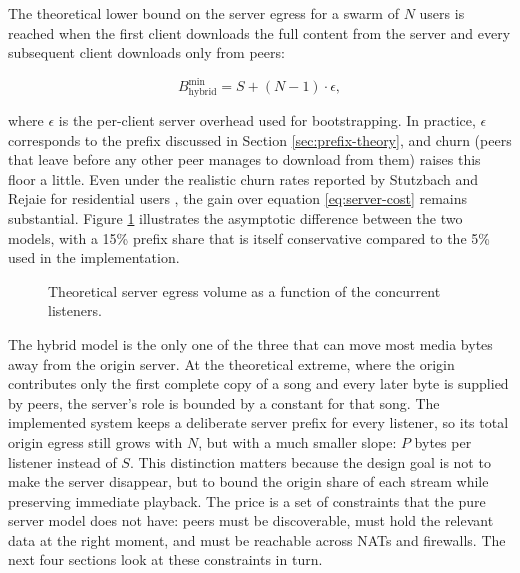 \par The theoretical lower bound on the server egress for a swarm of $N$ users is reached when the first client downloads the full content from the server and every subsequent client downloads only from peers:

\begin{equation}
  B_{\text{hybrid}}^{\min} = S + (N-1) \cdot \epsilon,
  \label{eq:hybrid-min}
\end{equation}

where $\epsilon$ is the per-client server overhead used for bootstrapping. In practice, $\epsilon$ corresponds to the prefix discussed in Section \ref{sec:prefix-theory}, and churn (peers that leave before any other peer manages to download from them) raises this floor a little. Even under the realistic churn rates reported by Stutzbach and Rejaie for residential users \cite{measurement_p2p}, the gain over equation \eqref{eq:server-cost} remains substantial. Figure \ref{fig:cost-comparison} illustrates the asymptotic difference between the two models, with a 15\% prefix share that is itself conservative compared to the 5\% used in the implementation.

\begin{figure}[htbp]
\centering
{}
\caption{Theoretical server egress volume as a function of the concurrent listeners.}
\label{fig:cost-comparison}
\end{figure}

\indent \par The hybrid model is the only one of the three that can move most media bytes away from the origin server. At the theoretical extreme, where the origin contributes only the first complete copy of a song and every later byte is supplied by peers, the server's role is bounded by a constant for that song. The implemented system keeps a deliberate server prefix for every listener, so its total origin egress still grows with $N$, but with a much smaller slope: $P$ bytes per listener instead of $S$. This distinction matters because the design goal is not to make the server disappear, but to bound the origin share of each stream while preserving immediate playback. The price is a set of constraints that the pure server model does not have: peers must be discoverable, must hold the relevant data at the right moment, and must be reachable across NATs and firewalls. The next four sections look at these constraints in turn.


